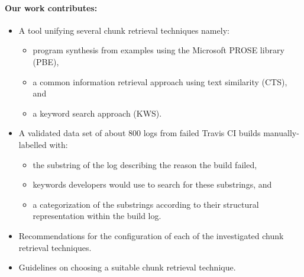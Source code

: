 \documentclass[\myrootdir/main.tex]{subfiles}
\begin{document}
\paragraph{Our work contributes:}
\begin{itemize}
  \item A tool unifying several chunk retrieval techniques namely:
        \begin{itemize}
          \item program synthesis from examples using the Microsoft PROSE library (PBE),
          \item a common information retrieval approach using text similarity (CTS), and
          \item a keyword search approach (KWS).
        \end{itemize}
  \item A validated data set of about 800 logs from failed Travis CI builds manually-labelled with:
        \begin{itemize}
          \item the substring of the log describing the reason the build failed,
          \item keywords developers would use to search for these substrings, and
          \item a categorization of the substrings according to their structural representation within the build log.
        \end{itemize}
  \item Recommendations for the configuration of each of the investigated chunk retrieval techniques.
  \item Guidelines on choosing a suitable chunk retrieval technique.
\end{itemize}
\end{document}
